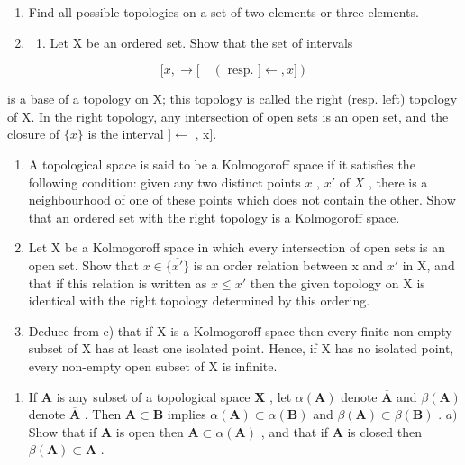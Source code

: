 \BourbakiExerciseGroup

\begin{enumerate}
\def\labelenumi{\arabic{enumi})}
\item
  Find all possible topologies on a set of two elements or three elements.
\item
  \begin{enumerate}
  \def\labelenumii{\alph{enumii})}
  \tightlist
  \item
    Let X be an ordered set. Show that the set of intervals
  \end{enumerate}
\end{enumerate}

\[
[ x, \rightarrow [ \quad (\text { resp. } ] \leftarrow , x ])
\]

is a base of a topology on X; this topology is called the right (resp. left) topology of X. In the right topology, any intersection of open sets is an open set, and the closure of \(\{x\}\) is the interval {]}\(\leftarrow\) , x{]}.

\begin{enumerate}
\def\labelenumi{\alph{enumi})}
\setcounter{enumi}{1}
\item
  A topological space is said to be a Kolmogoroff space if it satisfies the following condition: given any two distinct points \(x\) , \(x'\) of \(X\) , there is a neighbourhood of one of these points which does not contain the other. Show that an ordered set with the right topology is a Kolmogoroff space.
\item
  Let X be a Kolmogoroff space in which every intersection of open sets is an open set. Show that \(x \in \overline{\{x'\}}\) is an order relation between x and \(x'\) in X, and that if this relation is written as \(x \leqslant x'\) then the given topology on X is identical with the right topology determined by this ordering.
\item
  Deduce from c) that if X is a Kolmogoroff space then every finite non-empty subset of X has at least one isolated point. Hence, if X has no isolated point, every non-empty open subset of X is infinite.
\end{enumerate}

\begin{enumerate}
\def\labelenumi{\arabic{enumi})}
\setcounter{enumi}{2}
\tightlist
\item
  If \(\mathbf{A}\) is any subset of a topological space \(\mathbf{X}\) , let \(\alpha(\mathbf{A})\) denote \(\overline{\mathbf{A}}\) and \(\beta(\mathbf{A})\) denote \(\overline{\mathbf{A}}\) . Then \(\mathbf{A} \subset \mathbf{B}\) implies \(\alpha(\mathbf{A}) \subset \alpha(\mathbf{B})\) and \(\beta(\mathbf{A}) \subset \beta(\mathbf{B})\) . \(a)\) Show that if \(\mathbf{A}\) is open then \(\mathbf{A} \subset \alpha(\mathbf{A})\) , and that if \(\mathbf{A}\) is closed then \(\beta(\mathbf{A}) \subset \mathbf{A}\) .
\end{enumerate}

